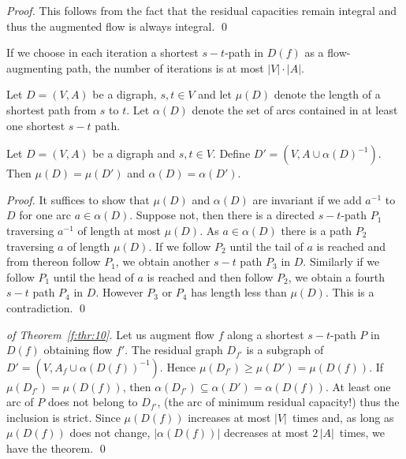 \begin{proof}
This follows from the fact that the residual capacities remain
integral and thus the augmented flow is always integral. \qed 
\end{proof}



\begin{theorem}
\label{f:thr:10}
If we choose in each iteration a shortest $s-t$-path in $D(f)$ as a
flow-augmenting path, the number of iterations is at most $|V| \cdot|A|$. 
  
\end{theorem}

\begin{definition}
  Let $D = (V,A)$ be a digraph, $s,t \in V$  and let  $\mu(D)$ denote the
  length of a  shortest path from $s$ to $t$. Let $\alpha(D)$ denote the set
  of arcs contained in at least one shortest $s-t$ path.
\end{definition}

\begin{theorem}
  \label{f:thr:11}
  Let  $D = (V,A)$ be a digraph and  $s,t \in V$. Define $D' = (V,A \cup
  \alpha(D)^{-1})$. Then $\mu(D) = \mu(D')$ and $\alpha(D) = \alpha(D')$.
\end{theorem}


\begin{proof}
  It suffices to show that $\mu(D)$ and $\alpha(D)$ are invariant if we add
  $a^{-1}$ to $D$ for one arc $a \in \alpha(D)$. Suppose not, then there is a
  directed $s-t$-path $P_1$ traversing $a^{-1}$ of length at most
  $\mu(D)$. As $a \in \alpha(D)$ there is a path $P_2$ traversing $a$ of length
  $\mu(D)$. If we follow $P_2$  until the tail of $a$ is reached  and
  from thereon follow $P_1$, we obtain another $s-t$ path $P_3$ in $D$.
  Similarly if we follow $P_1$ until the head of $a$ is reached and then follow $P_2$,
  we obtain a fourth $s-t$ path $P_4$ in $D$. However $P_3$ or $P_4$ has length less
  than $\mu(D)$. This is a contradiction. \qed
\end{proof}


\begin{proof}[of Theorem~\ref{f:thr:10}]
  Let us augment flow $f$ along a shortest $s-t$-path $P$ in $D(f)$
  obtaining flow $f'$. The residual graph $D_{f'}$ is a subgraph of
  $D' = (V, A_f \cup\alpha(D(f))^{-1})$. Hence $\mu(D_{f'}) \geq \mu(D')=\mu(D(f))$. If
  $\mu(D_{f'})=\mu(D(f))$, then $\alpha(D_{f'})\subseteq\alpha(D') = \alpha(D(f))$. At least one
  arc of $P$ does not belong to $D_{f'}$, (the arc of minimum residual
  capacity!) thus the inclusion is
  strict. Since $\mu(D(f))$ increases at most $|V|$~times and, as long as
  $\mu(D(f))$ does not change, $|\alpha(D(f))|$ decreases at most $2\, |A|$~times, we
  have the theorem. \qed
\end{proof}

